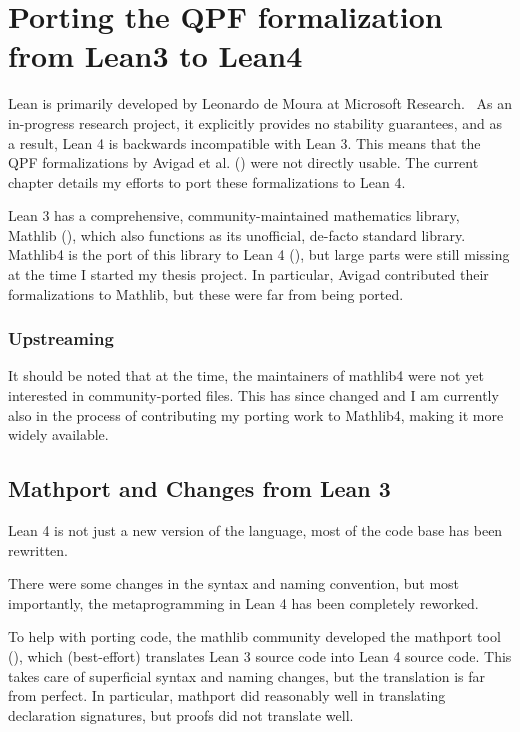 
\chapter{Porting the QPF formalization from Lean3 to Lean4}%
\label{ch:porting}

Lean is primarily developed by Leonardo de Moura \etal{} at Microsoft Research.~\cite{demouraLeanTheoremProver2015, avigadTheoremProvingLean} As an in-progress research project, it explicitly provides no stability guarantees, and as a result, Lean 4 is backwards incompatible with Lean 3.
This means that the QPF formalizations by Avigad et al. \etal{}
(\cite{avigadDataTypesQuotients2019a}) were not directly usable. The current chapter details my efforts to port these formalizations to Lean 4.



Lean 3 has a comprehensive, community-maintained mathematics library, Mathlib (\cite{themathlibcommunityLeanMathematicalLibrary2020}), 
which also functions as its unofficial, de-facto standard library.
Mathlib4 is the port of this library to Lean 4 (\cite{mathlib4}),
but large parts were still missing at the time I started my thesis project.
In particular, Avigad \etal{} contributed their formalizations to Mathlib, but these were far from
being ported.



\subsection*{Upstreaming}
It should be noted that at the time, the maintainers of mathlib4 were not yet interested in 
community-ported files. This has since changed and I am currently also in the process of
contributing my porting work to Mathlib4, making it more widely available.




\section{Mathport and Changes from Lean 3}
Lean 4 is not just a new version of the language, most of the code base has been rewritten.

There were some changes in the syntax and naming convention, but most importantly, 
the metaprogramming in Lean 4 has been completely reworked.

To help with porting code, the mathlib community developed the mathport tool (\cite{mathport}), which 
(best-effort) translates Lean 3 source code into Lean 4 source code. This takes care of superficial 
syntax and naming changes, but the translation is far from perfect.
In particular, mathport did reasonably well in translating declaration signatures, 
but proofs did not translate well.

